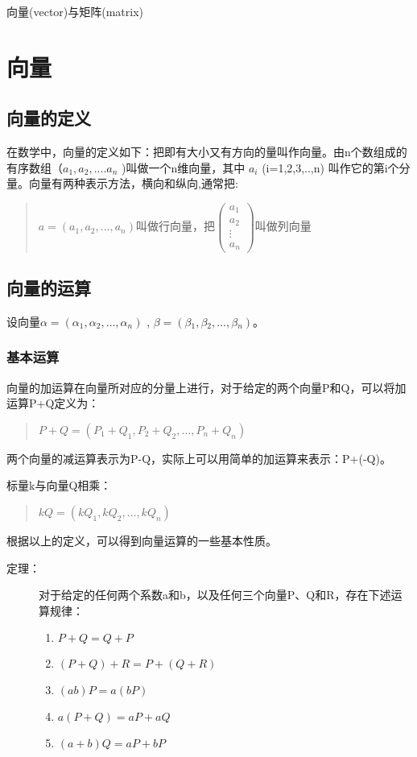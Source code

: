 \documentclass[a4paper,10pt]{article}
\begin{document}
\begin{CJK}{UTF8}{song}
\begin{center}
\Large 向量(vector)与矩阵(matrix)
\end{center}
\section{向量}
\subsection{向量的定义}
在数学中，向量的定义如下：把即有大小又有方向的量叫作向量。由n个数组成的有序数组（$a_{1},a_{2},....a_{n}$ )叫做一个n维向量，其中 $a_i$ (i=1,2,3,..,n) 叫作它的第i个分量。向量有两种表示方法，横向和纵向,通常把:
\begin{quote}
$a=(a_1,a_2,...,a_n)$叫做行向量，把$\left( \begin{array}{c} a_1 \\ a_2 \\ \vdots{} \\ a_n \end{array} \right)$叫做列向量
\end{quote}
\subsection{向量的运算}
设向量$\alpha=(\alpha{}_{1},\alpha{}_{2},\ldots{},\alpha{}_{n})$ , $\beta=(\beta{}_{1},\beta{}_{2},\ldots{},\beta{}_{n})$。
\subsubsection{基本运算}
向量的加运算在向量所对应的分量上进行，对于给定的两个向量P和Q，可以将加运算P+Q定义为：
\begin{quote}
$P+Q=(P_{1}+Q_{1},P_{2}+Q_{2},\ldots{},P_{n}+Q_{n}) $
\end{quote}
两个向量的减运算表示为P-Q，实际上可以用简单的加运算来表示：P+(-Q)。

标量k与向量Q相乘：
\begin{quote}
$kQ=(kQ_{1},kQ_{2},\ldots{},kQ_{n})$
\end{quote}
根据以上的定义，可以得到向量运算的一些基本性质。
\begin{description}
 \item[定理：]对于给定的任何两个系数a和b，以及任何三个向量P、Q和R，存在下述运算规律：
\begin{enumerate}
\item $P+Q=Q+P$
\item $(P+Q)+R=P+(Q+R)$
\item $(ab)P=a(bP)$
\item $a(P+Q)=aP+aQ$
\item $(a+b)Q=aP+bP$
\end{enumerate}
\end{description}


\end{CJK}
\end{document}
